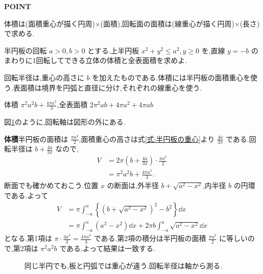 \begin{bookpoint}
\textbf{POINT}\par
体積は(面積重心が描く円周)$\times$(面積),回転面の面積は(線重心が描く円周)$\times$(長さ)で求める.
\end{bookpoint}

\begin{example}{半円板の回転}
$a>0$,\,$b>0$ とする.上半円板 $x^2+y^2\le a^2$,\,$y\ge0$ を,直線 $y=-b$ のまわりに1回転してできる立体の体積と全表面積を求めよ.
\end{example}

回転半径は,重心の高さに $b$ を加えたものである.体積には半円板の面積重心を使う.表面積は境界を円弧と直径に分け,それぞれの線重心を使う.

体積 $\pi^2a^2b+\frac{4\pi a^3}{3}$,全表面積 $2\pi^2ab+4\pi a^2+4\pi ab$

図\ref{図:半円の二つの重心}のように,回転軸は図形の外にある.

\textbf{体積}\quad 半円板の面積は $\frac{\pi a^2}{2}$,面積重心の高さは式\eqref{式:半円板の重心}より $\frac{4a}{3\pi}$ である.回転半径は $b+\frac{4a}{3\pi}$ なので,
\begin{align*}
V&=2\pi\left(b+\frac{4a}{3\pi}\right)\cdot\frac{\pi a^2}{2}\\
 &=\pi^2a^2b+\frac{4\pi a^3}{3}.
\end{align*}
断面でも確かめておこう.位置 $x$ の断面は,外半径 $b+\sqrt{a^2-x^2}$,内半径 $b$ の円環である.よって
\begin{align*}
V&=\pi\int_{-a}^a\left\{\left(b+\sqrt{a^2-x^2}\right)^2-b^2\right\}\dd x\\
 &=\pi\int_{-a}^a(a^2-x^2)\dd x+2\pi b\int_{-a}^a\sqrt{a^2-x^2}\dd x
\end{align*}
となる.第1項は $\pi\cdot\frac{4a^3}{3}=\frac{4\pi a^3}{3}$ である.第2項の積分は半円板の面積 $\frac{\pi a^2}{2}$ に等しいので,第2項は $\pi^2a^2b$ である.よって結果は一致する.

\begin{figure}[htbp]
\centering
{}
\caption{同じ半円でも,板と円弧では重心が違う.回転半径は軸から測る.}\label{図:半円の二つの重心}
\end{figure}

